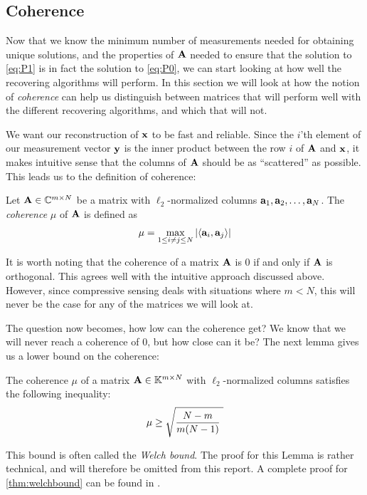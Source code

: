 \subsection{Coherence}
\label{sec:coherence}
Now that we know the minimum number of measurements needed for obtaining unique solutions, and the properties of $ \mathbf{A} $ needed to ensure that the solution to \eqref{eq:P1} is in fact the solution to \eqref{eq:P0}, we can start looking at how well the recovering algorithms will perform. In this section we will look at how the notion of \textit{coherence} can help us distinguish between matrices that will perform well with the different recovering algorithms, and which that will not. 

We want our reconstruction of $ \mathbf{x} $ to be fast and reliable. Since the $ i $'th element of our measurement vector $ \mathbf{y} $ is the inner product between the row $ i $ of $ \mathbf{A} $ and $ \mathbf{x} $, it makes intuitive sense that the columns of $ \mathbf{A} $ should be as ``scattered'' as possible. This leads us to the definition of coherence: 

\begin{definition}
	Let $ \mathbf{A} \in \mathbb{C}^{m\times N} $ be a matrix with $ \ell_{2} $-normalized columns $ \mathbf{a}_{1}, \mathbf{a}_{2}, \ldots, \mathbf{a}_{N} $. The \textit{coherence} $ \mu $ of $ \mathbf{A} $ is defined as
	\[
		\mu = \max_{1\leq i \neq j \leq N} \left|\langle \mathbf{a}_{i} , \mathbf{a}_{j} \rangle\right|
	\]
\end{definition}

It is worth noting that the coherence of a matrix $ \mathbf{A} $ is $ 0 $ if and only if $ \mathbf{A} $ is orthogonal. This agrees well with the intuitive approach discussed above. However, since compressive sensing deals with situations where $ m < N $, this will never be the case for any of the matrices we will look at. 

The question now becomes, how low can the coherence get? We know that we will never reach a coherence of $ 0 $, but how close can it be? The next lemma gives us a lower bound on the coherence:

\begin{lemma} \label{thm:welchbound}
	The coherence $ \mu $ of a matrix $ \mathbf{A} \in \mathbb{K}^{m \times N} $ with $ \ell_{2} $-normalized columns satisfies the following inequality:
	\[
		\mu \geq \sqrt{\dfrac{N-m}{m(N-1)}~}
	\]
\end{lemma}

\noindent This bound is often called the \textit{Welch bound}. The proof for this Lemma is rather technical, and will therefore be omitted from this report. A complete proof for \cref{thm:welchbound} can be found in \cite[Theorem~5.7]{foucart13intro}.


